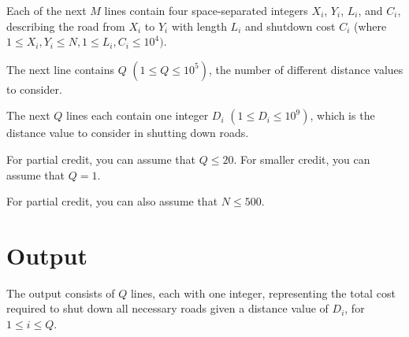 Each of the next $M$ lines contain four space-separated integers $X_i$, $Y_i$, $L_i$, and $C_i$,
describing the road from $X_i$ to $Y_i$ with length $L_i$ and shutdown cost $C_i$ (where $1 \leq
X_i,Y_i \leq N, 1 \leq L_i,C_i \leq 10^4)$.

The next line contains $Q$ $(1 \leq Q \leq 10^5)$, the number of different distance values to
consider.

The next $Q$ lines each contain one integer $D_i$ $(1 \leq D_i \leq 10^9)$, which is the distance value to consider in shutting down roads.


For partial credit, you can assume that $Q \leq 20$. For smaller credit, you can assume that $Q =
1$.

For partial credit, you can also assume that $N \leq 500$.


\section*{Output}
The output consists of $Q$ lines, each with one integer, representing the total cost required to shut
down all necessary roads given a distance value of $D_i$, for $1 \leq i \leq Q$.
